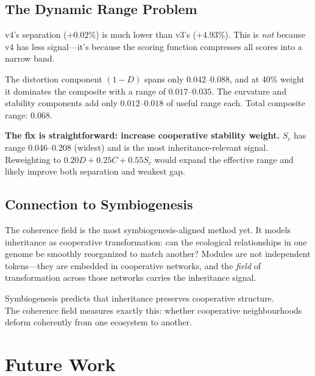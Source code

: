 \documentclass{../yalumba}
\begin{document}
\subsection{The Dynamic Range Problem}

v4's separation ($+0.02\%$) is much lower than v3's ($+4.93\%$).  This is
\emph{not} because v4 has less signal---it's because the scoring function
compresses all scores into a narrow band.

The distortion component $(1 - D)$ spans only $0.042$--$0.088$, and at 40\%
weight it dominates the composite with a range of $0.017$--$0.035$.  The
curvature and stability components add only $0.012$--$0.018$ of useful range
each.  Total composite range: $0.068$.

\begin{keyfinding}
\textbf{The fix is straightforward: increase cooperative stability weight.}
$S_c$ has range 0.046--0.208 (widest) and is the most inheritance-relevant
signal.  Reweighting to $0.20D + 0.25C + 0.55S_c$ would expand the
effective range and likely improve both separation and weakest gap.
\end{keyfinding}

\subsection{Connection to Symbiogenesis}

The coherence field is the most symbiogenesis-aligned method yet.  It models
inheritance as cooperative transformation: can the ecological relationships
in one genome be smoothly reorganized to match another?  Modules are not
independent tokens---they are embedded in cooperative networks, and the
\emph{field} of transformation across those networks carries the
inheritance signal.

\begin{pullquote}
Symbiogenesis predicts that inheritance preserves cooperative structure.\\
The coherence field measures exactly this: whether cooperative neighbourhoods\\
deform coherently from one ecosystem to another.
\end{pullquote}


\section{Future Work}
\label{sec:future}
\end{document}

